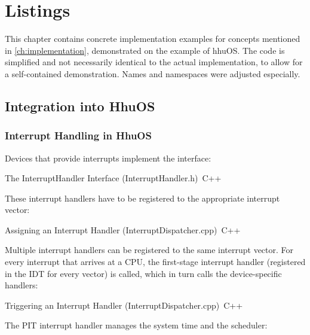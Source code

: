 \chapter{Listings}
\label{ch:listings}

This chapter contains concrete implementation examples for concepts mentioned in \autoref{ch:implementation}, demonstrated on the example of hhuOS\@.
The code is simplified and not necessarily identical to the actual implementation, to allow for a self-contained demonstration.
Names and namespaces were adjusted especially.

\clearpage

\section{Integration into HhuOS}
\label{sec:apxhhuos}

\subsection{Interrupt Handling in HhuOS}
\label{subsec:apxcurrenthhuos}

Devices that provide interrupts implement the  interface:

\begin{codeblock}{The InterruptHandler Interface (InterruptHandler.h)~\autocite{hhuos}}{C++}
\end{codeblock}

These interrupt handlers have to be registered to the appropriate interrupt vector:

\begin{codeblock}{Assigning an Interrupt Handler (InterruptDispatcher.cpp)~\autocite{hhuos}}{C++}
\end{codeblock}

Multiple interrupt handlers can be registered to the same interrupt vector.
For every interrupt that arrives at a CPU, the first-stage interrupt handler (registered in the IDT for every vector) is called, which in turn calls the device-specific handlers:

\begin{codeblock}{Triggering an Interrupt Handler (InterruptDispatcher.cpp)~\autocite{hhuos}}{C++}
\end{codeblock}

The PIT interrupt handler manages the system time and the scheduler:

